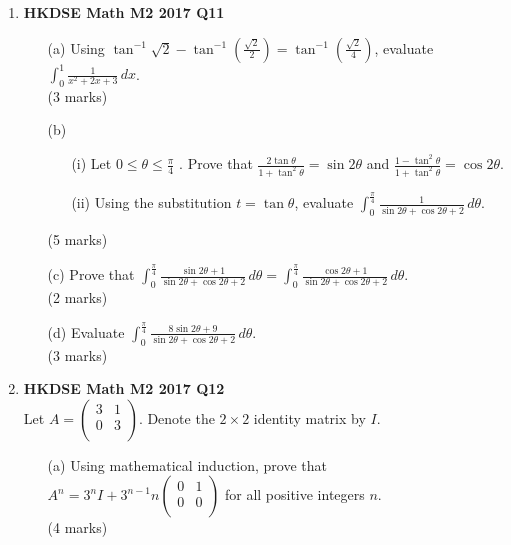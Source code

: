 \documentclass[12pt]{article}
\begin{document}
\begin{enumerate}
	\item \textbf{HKDSE Math M2 2017 Q11}
	\begin{enumerate}
		\item [(a)]Using $\displaystyle\tan^{-1}{\sqrt{2}} - \tan^{-1}{\left(\frac{\sqrt{2}}{2}\right)} = \tan^{-1}{\left(\frac{\sqrt{2}}{4}\right)}$, evaluate $\displaystyle\int_{0}^{1} \frac{1}{x^2+2x+3}\,dx $. \\(3 marks)
		\item [(b)]
		\begin{enumerate}
			\item [(i)]Let $0 \leq \theta \leq \displaystyle\frac{\pi}{4}$ . Prove that $\displaystyle\frac{2\tan{\theta}}{1 + \tan^2{\theta}} = \sin{2\theta}$ and $\displaystyle\frac{1-\tan^2{\theta}}{1 + \tan^2{\theta}} = \cos{2\theta}$.
			\item [(ii)]Using the substitution $t = \tan{\theta}$, evaluate $\displaystyle\int_{0}^{\frac{\pi}{4}} \frac{1}{\sin{2\theta} + \cos{2\theta} + 2} \,d\theta$.
		\end{enumerate}
		(5 marks)
		\item [(c)]Prove that $\displaystyle\int_{ 0}^{\frac{\pi}{4}} \frac{\sin{2\theta}+1 }{\sin{2\theta} + \cos{2\theta} + 2} \,d\theta = \displaystyle\int_{ 0}^{\frac{\pi}{4}} \frac{\cos{2\theta}+1}{\sin{2\theta} + \cos{2\theta} + 2} \,d\theta$. \\(2 marks)
		\item [(d)]Evaluate $\displaystyle\int_{ 0}^{\frac{\pi}{4}} \frac{8\sin{2\theta} + 9}{\sin{2\theta} + \cos{2\theta} + 2} \,d\theta$. \\(3 marks)
	\end{enumerate}



	\item \textbf{HKDSE Math M2 2017 Q12}\\
	Let $A = \begin{pmatrix}
		3 & 1\\
		0 & 3\\
	\end{pmatrix}$. Denote the $2 \times 2$ identity matrix by $I$.
	\begin{enumerate}
		\item [(a)]Using mathematical induction, prove that $A^n = 3^nI + 3^{n-1}n\begin{pmatrix}
			0&1\\0&0\\
			\end{pmatrix}$ for all positive integers $n$. \\(4 marks)


\end{enumerate}
\end{enumerate}
\end{document}

